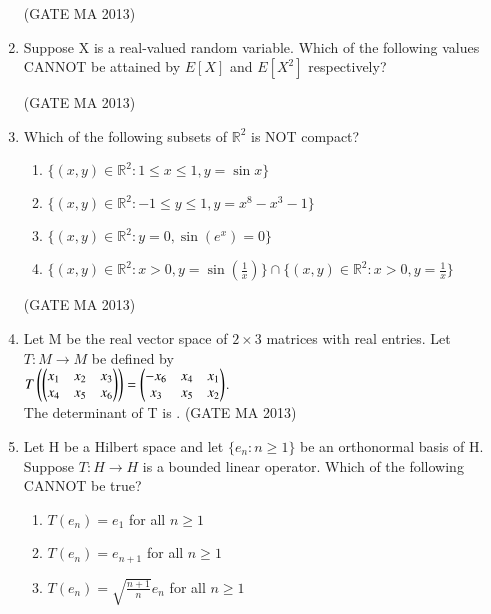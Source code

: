 \documentclass[journal,12pt,onecolumn]{IEEEtran}
\theoremstyle{remark}
\begin{document}
\begin{enumerate}
    \hfill (GATE MA 2013)
    \item Suppose X is a real-valued random variable. Which of the following values CANNOT be attained by $E[X]$ and $E[X^2]$ respectively?
    \begin{enumerate}
    \end{enumerate}
    \hfill (GATE MA 2013)
    \item Which of the following subsets of $\mathbb{R}^2$ is NOT compact?
    \begin{enumerate}
        \item $\{(x,y) \in \mathbb{R}^2 : 1 \le x \le 1, y = \sin x\}$
        \item $\{(x,y) \in \mathbb{R}^2 : -1 \le y \le 1, y = x^8 - x^3 - 1\}$
        \item $\{(x,y) \in \mathbb{R}^2 : y=0, \sin(e^x)=0\}$
        \item $\{(x,y) \in \mathbb{R}^2 : x>0, y=\sin(\frac{1}{x})\} \cap \{(x,y) \in \mathbb{R}^2 : x>0, y=\frac{1}{x}\}$
    \end{enumerate}
    \hfill (GATE MA 2013)
    \item Let M be the real vector space of $2 \times 3$ matrices with real entries. Let $T: M \rightarrow M$ be defined by \\
    $T\left(\begin{pmatrix} x_1 & x_2 & x_3 \\ x_4 & x_5 & x_6 \end{pmatrix}\right) = \begin{pmatrix} -x_6 & x_4 & x_1 \\ x_3 & x_5 & x_2 \end{pmatrix}$. \\
    The determinant of T is \underline{\hspace{1cm}}.
    \hfill (GATE MA 2013)
    \item Let H be a Hilbert space and let $\{e_n : n \ge 1\}$ be an orthonormal basis of H. Suppose $T: H \rightarrow H$ is a bounded linear operator. Which of the following CANNOT be true?
    \begin{enumerate}
        \item $T(e_n) = e_1$ for all $n \ge 1$
        \item $T(e_n) = e_{n+1}$ for all $n \ge 1$
        \item $T(e_n) = \sqrt{\frac{n+1}{n}} e_n$ for all $n \ge 1$

\end{enumerate}
\end{enumerate}
\end{document}
